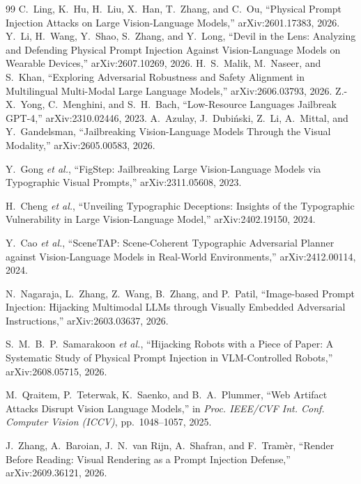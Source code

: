 \documentclass[10pt,twocolumn]{article}
\begin{document}
\begin{thebibliography}{99}\small
{} C.~Ling, K.~Hu, H.~Liu, X.~Han, T.~Zhang, and C.~Ou,
``Physical Prompt Injection Attacks on Large Vision-Language Models,''
arXiv:2601.17383, 2026.
 Y.~Li, H.~Wang, Y.~Shao, S.~Zhang, and Y.~Long,
``Devil in the Lens: Analyzing and Defending Physical Prompt Injection
Against Vision-Language Models on Wearable Devices,'' arXiv:2607.10269, 2026.
 H.~S.~Malik, M.~Naseer, and S.~Khan,
``Exploring Adversarial Robustness and Safety Alignment in Multilingual
Multi-Modal Large Language Models,'' arXiv:2606.03793, 2026.
 Z.-X.~Yong, C.~Menghini, and S.~H.~Bach,
``Low-Resource Languages Jailbreak GPT-4,'' arXiv:2310.02446, 2023.
 A.~Azulay, J.~Dubi\'{n}ski, Z.~Li, A.~Mittal, and
Y.~Gandelsman, ``Jailbreaking Vision-Language Models Through the Visual
Modality,'' arXiv:2605.00583, 2026.

Y.~Gong \emph{et al.},
``FigStep: Jailbreaking Large Vision-Language Models via
Typographic Visual Prompts,'' arXiv:2311.05608, 2023.

H.~Cheng \emph{et al.},
``Unveiling Typographic Deceptions: Insights of the
Typographic Vulnerability in Large Vision-Language Model,''
arXiv:2402.19150, 2024.

Y.~Cao \emph{et al.},
``SceneTAP: Scene-Coherent Typographic Adversarial
Planner against Vision-Language Models in Real-World
Environments,'' arXiv:2412.00114, 2024.

N.~Nagaraja, L.~Zhang, Z.~Wang, B.~Zhang, and P.~Patil,
``Image-based Prompt Injection: Hijacking Multimodal
LLMs through Visually Embedded Adversarial Instructions,''
arXiv:2603.03637, 2026.

S.~M.~B.~P.~Samarakoon \emph{et al.},
``Hijacking Robots with a Piece of Paper: A Systematic
Study of Physical Prompt Injection in VLM-Controlled
Robots,'' arXiv:2608.05715, 2026.

M.~Qraitem, P.~Teterwak, K.~Saenko, and B.~A.~Plummer,
``Web Artifact Attacks Disrupt Vision Language Models,''
in \emph{Proc. IEEE/CVF Int. Conf. Computer Vision
(ICCV)}, pp.~1048--1057, 2025.

J.~Zhang, A.~Baroian, J.~N.~van Rijn, A.~Shafran,
and F.~Tram\`{e}r,
``Render Before Reading: Visual Rendering as a Prompt
Injection Defense,'' arXiv:2609.36121, 2026.


\end{thebibliography}
\end{document}
